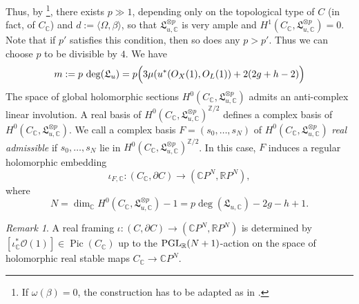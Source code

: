 \documentclass[11pt,psamsfonts, oneside, reqno]{amsart}
\newcommand{\cl}{\colon}
\newcommand{\lbr}[1]{\Bigl(#1\Bigr)}
\newcommand{\lspan}[1]{\langle {#1}\rangle}
\newcommand{\PGL}{\normalfont\text{PGL}}
\newcommand{\del}{\partial}
\newcommand{\bC}{\mathbb{C}}
\newcommand{\bR}{\mathbb{R}}
\newcommand{\bZ}{\mathbb{Z}}
\newcommand{\cO}{\mathcal{O}}
\newcommand{\fL}{\mathfrak{L}}
\theoremstyle{definition}
\theoremstyle{remark}
\newtheorem{remark}[theorem]{Remark}
\numberwithin{equation}{section}
\DeclareMathOperator{\Pic}{Pic}
\begin{document}
\noindent
Thus, by \cite[Lemma~3.2]{HS22}\footnote{If $\omega(\beta) = 0$, the construction has to be adapted as in \cite[Remark~3.14]{HS22}.},
  there exists $p \gg 1$, depending only on the topological type of $C$ (in fact, of $C_\bC$) and $d:=\lspan{\Omega,\beta}$, so that $\fL_{u,\bC}^{\otimes p}$ is very ample and $H^1(C_\bC,\fL_{u,\bC}^{\otimes p}) = 0$. Note that if $p'$ satisfies this condition, then so does any $p > p'$. Thus we can choose $p$ to be divisible by $4$. We have 
$$m := p\,\deg(\fL_u) = p\lbr{3\mu(u^*(O_X(1),O_L(1)) + 2(2g+ h-2)}$$\noindent
 The space of global holomorphic sections $H^0(C_\bC,\fL_{u,\bC}^{\otimes p})$ admits an anti-complex linear involution. A real basis of $H^0(C_\bC,\fL_{u,\bC}^{\otimes p})^{\bZ/2}$ defines a complex basis of $H^0(C_\bC,\fL_{u,\bC}^{\otimes p})$. We call a complex basis $F = (s_0,\dots,s_N)$ of $H^0(C_\bC,\fL_{u,\bC}^{\otimes p})$ \emph{real admissible} if $s_0,\dots,s_N$ lie in $H^0(C_\bC,\fL_{u,\bC}^{\otimes p})^{\bZ/2}$. In this case, $F$ induces a regular holomorphic embedding 
$$\iota_{F,\bC}\cl (C_\bC,\del C)\to (\bC P^N,\bR P^N),$$\noindent
where 
\begin{equation}\label{eq:dimension-base-lag} N = \dim_\bC H^0(C_\bC,\fL_{u,\bC}^{\otimes p})-1 = p \deg(\fL_{u,\bC}) - 2g-h+1.\end{equation} 

\begin{remark}\label{rem:real-admissible-uniqueness}
	A real framing $\iota\cl (C,\del C)\to (\bC P^N,\bR P^N)$ is determined by $[\iota_\bC^*\cO(1)]\in \Pic(C_\bC)$ 
	up to the $\PGL_\bR(N+1)$-action on the space of holomorphic real stable maps $C_{\bC} \rightarrow\bC P^N$.
\end{remark}
\end{document}
